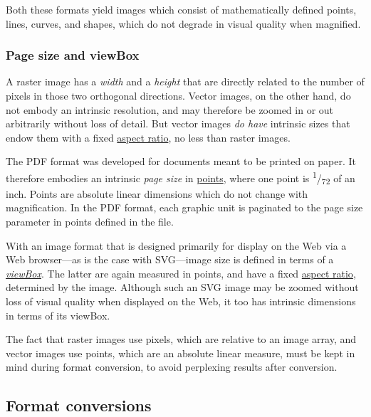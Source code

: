 \documentclass[
  a4paper,
]{article}
\begin{document}
Both these formats yield images which consist of mathematically defined
points, lines, curves, and shapes, which do not degrade in visual
quality when magnified.

\hypertarget{page-size-and-viewbox}{%
\subsubsection{Page size and viewBox}\label{page-size-and-viewbox}}

A raster image has a \emph{width} and a \emph{height} that are directly
related to the number of pixels in those two orthogonal directions.
Vector images, on the other hand, do not embody an intrinsic resolution,
and may therefore be zoomed in or out arbitrarily without loss of
detail. But vector images \emph{do have} intrinsic sizes that endow them
with a fixed \href{https://en.wikipedia.org/wiki/Aspect_ratio}{aspect
ratio}, no less than raster images.

The PDF format was developed for documents meant to be printed on paper.
It therefore embodies an intrinsic \emph{page size} in
\href{https://en.wikipedia.org/wiki/Point_(typography)}{points}, where
one point is \textsuperscript{1}/\textsubscript{72} of an inch. Points
are absolute linear dimensions which do not change with magnification.
In the PDF format, each graphic unit is paginated to the page size
parameter in points defined in the file.

With an image format that is designed primarily for display on the Web
via a Web browser---as is the case with SVG---image size is defined in
terms of a
\href{https://developer.mozilla.org/en-US/docs/Web/SVG/Attribute/viewBox}{\emph{viewBox}}.
The latter are again measured in points, and have a fixed
\href{https://en.wikipedia.org/wiki/Aspect_ratio}{aspect ratio},
determined by the image. Although such an SVG image may be zoomed
without loss of visual quality when displayed on the Web, it too has
intrinsic dimensions in terms of its viewBox.

The fact that raster images use pixels, which are relative to an image
array, and vector images use points, which are an absolute linear
measure, must be kept in mind during format conversion, to avoid
perplexing results after conversion.

\hypertarget{format-conversions}{%
\subsection{Format conversions}\label{format-conversions}}
\end{document}
